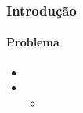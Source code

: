 \begin{frame}
\frametitle{Introdução}
    \framesubtitle{Problema}
        
    \begin{itemize}[<+->]
            \item \myliplip
            \item \myliplip
            \begin{itemize}
                \item \mylipsum
            \end{itemize}
    \end{itemize}
\end{frame}
 
